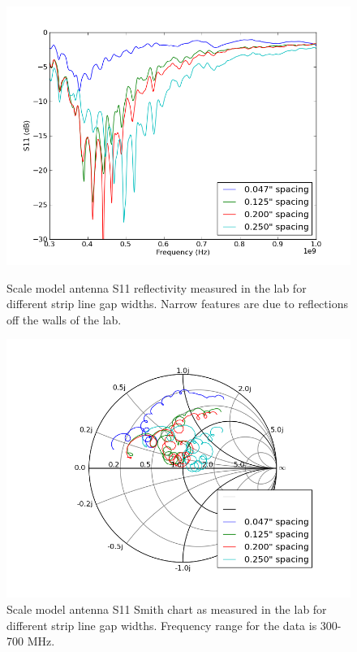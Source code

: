 \begin{figure}[htb]
\centering
\begin{minipage}[b]{0.50\textwidth}
\centering
\includegraphics[width=0.95\linewidth]{SCIHI_system/figures/HIbiscus_S11_model_spacing_dB.png}
\caption{Scale model antenna S11 reflectivity measured in the lab for different strip line gap widths. Narrow features are due to reflections off the walls of the lab.}
\label{Fig:HIS11_model_inc_dB}
\end{minipage}%
\begin{minipage}[b]{0.02\textwidth}
\hspace{1cm}
\end{minipage}%
\begin{minipage}[b]{0.46\textwidth}
\centering
\includegraphics[width=0.95\linewidth]{SCIHI_system/figures/HIbiscus_S11_model_spacing_Smith.png}
\caption{Scale model antenna S11 Smith chart as measured in the lab for different strip line gap widths. Frequency range for the data is 300-700 MHz. }
\label{Fig:HIS11_model_inc_Smith}
\end{minipage}
\end{figure}

